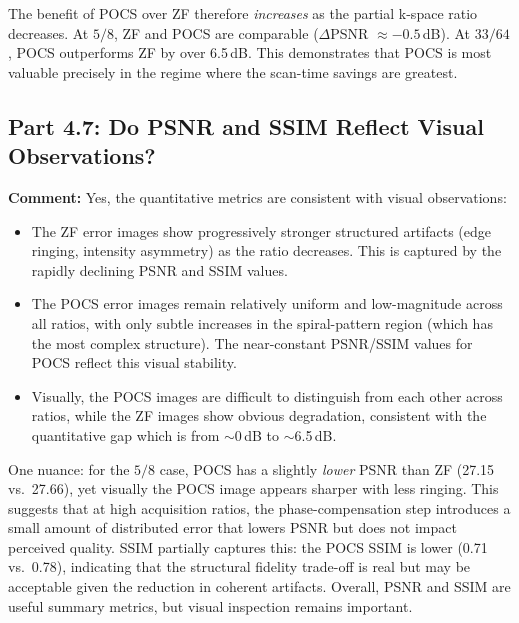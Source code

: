 \documentclass[12pt]{article}
\begin{document}
The benefit of POCS over ZF therefore \emph{increases} as the partial k-space ratio decreases. At $5/8$, ZF and POCS are comparable ($\Delta$PSNR $\approx -0.5$\,dB). At $33/64$, POCS outperforms ZF by over 6.5\,dB. This demonstrates that POCS is most valuable precisely in the regime where the scan-time savings are greatest.

\subsection{Part 4.7: Do PSNR and SSIM Reflect Visual Observations?}

\textbf{Comment:} Yes, the quantitative metrics are consistent with visual observations:

\begin{itemize}
    \item The ZF error images show progressively stronger structured artifacts (edge ringing, intensity asymmetry) as the ratio decreases. This is captured by the rapidly declining PSNR and SSIM values.
    \item The POCS error images remain relatively uniform and low-magnitude across all ratios, with only subtle increases in the spiral-pattern region (which has the most complex structure). The near-constant PSNR/SSIM values for POCS reflect this visual stability.
    \item Visually, the POCS images are difficult to distinguish from each other across ratios, while the ZF images show obvious degradation, consistent with the quantitative gap which is from $\sim$0\,dB to $\sim$6.5\,dB.
\end{itemize}

One nuance: for the $5/8$ case, POCS has a slightly \emph{lower} PSNR than ZF (27.15 vs.\ 27.66), yet visually the POCS image appears sharper with less ringing. This suggests that at high acquisition ratios, the phase-compensation step introduces a small amount of distributed error that lowers PSNR but does not impact perceived quality. SSIM partially captures this: the POCS SSIM is lower (0.71 vs.\ 0.78), indicating that the structural fidelity trade-off is real but may be acceptable given the reduction in coherent artifacts. Overall, PSNR and SSIM are useful summary metrics, but visual inspection remains important.
\end{document}
